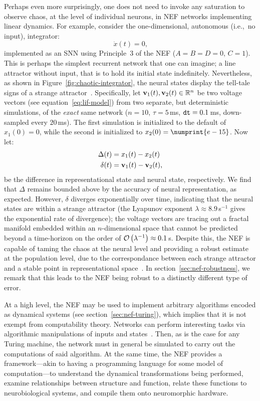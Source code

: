 Perhaps even more surprisingly, one does not need to invoke any saturation to observe chaos, at the level of individual neurons, in NEF networks implementing linear dynamics.
For example, consider the one-dimensional, autonomous (i.e.,~no input), integrator:
$$\dot{x}(t) = 0 \text{,}$$
implemented as an SNN using Principle~3 of the NEF ($A = B = D = 0$, $C = 1$).
This is perhaps the simplest recurrent network that one can imagine; a line attractor without input, that is to hold its initial state indefinitely.
Nevertheless, as shown in Figure~\ref{fig:chaotic-integrator}, the neural states display the tell-tale signs of a strange attractor~\citep[cf.~][Figure~9.3.5]{strogatz2000nonlinear}.
Specifically, let $\mathbf{v}_1(t), \mathbf{v}_2(t) \in \mathbb{R}^n$ be two voltage vectors (see equation~\ref{eq:lif-model}) from two separate, but deterministic simulations, of the \emph{exact} same network ($n = 10$, $\tau = 5$\,ms, $\texttt{dt}{} = 0.1$\,ms, down-sampled every $20$\,ms).
The first simulation is initialized to the default of $x_1(0) = 0$, while the second is initialized to $x_2(0) = \numprint{e-15}$.
Now let:
\begin{align*}
\Delta(t) &= x_1(t) - x_2(t) \\
\delta(t) &= \mathbf{v}_1(t) - \mathbf{v}_2(t) \text{,}
\end{align*}
be the difference in representational state and neural state, respectively.
We find that $\Delta$ remains bounded above by the accuracy of neural representation, as expected.
However, $\delta$ diverges exponentially over time, indicating that the neural states are within a strange attractor (the Lyapunov exponent $\lambda \approx 8.9$\,s${}^{-1}$ gives the exponential rate of divergence); the voltage vectors are tracing out a fractal manifold embedded within an $n$-dimensional space that cannot be predicted beyond a time-horizon on the order of $\mathcal{O}\left({\lambda^{-1}}\right) \approx 0.1$\,s.
Despite this, the NEF is capable of taming the chaos at the neural level and providing a robust estimate at the population level, due to the correspondance between each strange attractor and a stable point in representational space~\citep[][p.~237]{eliasmith2003a}.
In section~\ref{sec:nef-robustness}, we remark that this leads to the NEF being robust to a distinctly different type of error.

At a high level, the NEF may be used to implement arbitrary algorithms encoded as dynamical systems (see section~\ref{sec:nef-turing}), which implies that it is not exempt from computability theory. 
Networks can perform interesting tasks via algorithmic manipulations of inputs and states~\citep{choo2018}.
Then, as is the case for any Turing machine, the network must in general be simulated to carry out the computations of said algorithm.
At the same time, the NEF provides a framework---akin to having a programming language for some model of computation---to understand the dynamical transformations being performed, examine relationships between structure and function, relate these functions to neurobiological systems, and compile them onto neuromorphic hardware.

